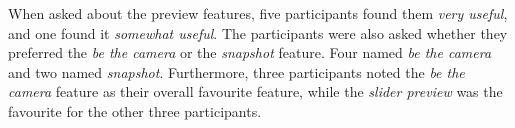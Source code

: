 When asked about the preview features, five participants found them \textit{very useful}, and one found it \textit{somewhat useful}. The participants were also asked whether they preferred the \textit{be the camera} or the \textit{snapshot} feature. Four named\textit{ be the camera} and two named \textit{snapshot}. Furthermore, three participants noted the \textit{be the camera} feature as their overall favourite feature, while the \textit{slider preview} was the favourite for the other three participants. 